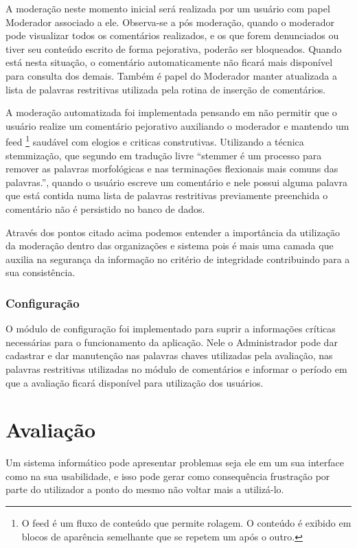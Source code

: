 \documentclass[12pt, a4paper]{report}
\begin{document}
A moderação neste momento inicial será realizada por um usuário com papel Moderador associado a ele. Observa-se a pós moderação, quando o moderador pode visualizar todos os comentários realizados, e os que forem denunciados ou tiver seu conteúdo escrito de forma pejorativa, poderão ser bloqueados. Quando está nesta situação, o comentário automaticamente não ficará mais disponível para consulta dos demais. Também é papel do Moderador manter atualizada a lista de palavras restritivas utilizada pela rotina de inserção de comentários. 

A moderação automatizada foi implementada pensando em não permitir que o usuário realize um comentário pejorativo auxiliando o moderador e mantendo um feed \footnote{O feed é um fluxo de conteúdo que permite rolagem. O conteúdo é exibido em blocos de aparência semelhante que se repetem um após o outro.}
saudável com elogios e criticas construtivas. Utilizando a técnica stemmização, que segundo \cite{porter1980} em tradução livre “stemmer é um processo para remover as palavras morfológicas e nas terminações flexionais mais comuns das palavras.”, quando o usuário escreve um comentário e nele possui alguma palavra que está contida numa lista de palavras restritivas previamente preenchida o comentário não é persistido no banco de dados.  

Através dos pontos citado acima podemos entender a importância da utilização da moderação dentro das organizações e sistema pois é  mais uma camada que auxilia na segurança da informação no critério de integridade contribuindo para a sua consistência.

\subsection{Configuração}
O módulo de configuração foi implementado para suprir a  informações críticas necessárias para o funcionamento da aplicação. Nele o Administrador pode dar cadastrar e dar manutenção nas palavras chaves utilizadas pela avaliação, nas palavras restritivas utilizadas no módulo de comentários e informar o período em que a avaliação ficará disponível para utilização dos usuários.

\chapter{Avaliação}
\label{chap:avaliacao}

Um sistema informático pode apresentar problemas seja ele em um sua interface como na sua usabilidade, e isso pode gerar como consequência frustração por parte do utilizador a ponto do mesmo não voltar mais a utilizá-lo.
\end{document}
